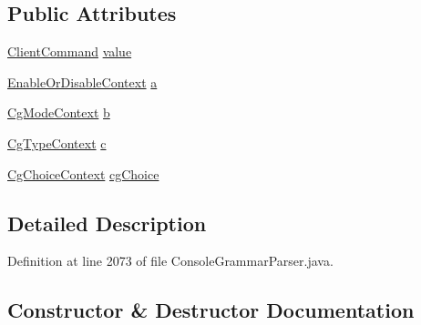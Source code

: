 \subsection*{Public Attributes}
\begin{DoxyCompactItemize}
\item 
\hyperlink{classgov_1_1nasa_1_1jpf_1_1inspector_1_1client_1_1_client_command}{Client\+Command} \hyperlink{classgov_1_1nasa_1_1jpf_1_1inspector_1_1client_1_1parser_1_1_console_grammar_parser_1_1_cmd_choice_generators_context_a014d7742f82aa480136081f8bbd0e389}{value}
\item 
\hyperlink{classgov_1_1nasa_1_1jpf_1_1inspector_1_1client_1_1parser_1_1_console_grammar_parser_1_1_enable_or_disable_context}{Enable\+Or\+Disable\+Context} \hyperlink{classgov_1_1nasa_1_1jpf_1_1inspector_1_1client_1_1parser_1_1_console_grammar_parser_1_1_cmd_choice_generators_context_a9200bbbd967ddd27d65c91ed74a236aa}{a}
\item 
\hyperlink{classgov_1_1nasa_1_1jpf_1_1inspector_1_1client_1_1parser_1_1_console_grammar_parser_1_1_cg_mode_context}{Cg\+Mode\+Context} \hyperlink{classgov_1_1nasa_1_1jpf_1_1inspector_1_1client_1_1parser_1_1_console_grammar_parser_1_1_cmd_choice_generators_context_aeab2b7b67ee700c7a202cdd3e381b382}{b}
\item 
\hyperlink{classgov_1_1nasa_1_1jpf_1_1inspector_1_1client_1_1parser_1_1_console_grammar_parser_1_1_cg_type_context}{Cg\+Type\+Context} \hyperlink{classgov_1_1nasa_1_1jpf_1_1inspector_1_1client_1_1parser_1_1_console_grammar_parser_1_1_cmd_choice_generators_context_a5e71d56306b980decd5eb0430415eeda}{c}
\item 
\hyperlink{classgov_1_1nasa_1_1jpf_1_1inspector_1_1client_1_1parser_1_1_console_grammar_parser_1_1_cg_choice_context}{Cg\+Choice\+Context} \hyperlink{classgov_1_1nasa_1_1jpf_1_1inspector_1_1client_1_1parser_1_1_console_grammar_parser_1_1_cmd_choice_generators_context_a3cd60475bb50ab9e9930b58121519142}{cg\+Choice}
\end{DoxyCompactItemize}


\subsection{Detailed Description}


Definition at line 2073 of file Console\+Grammar\+Parser.\+java.



\subsection{Constructor \& Destructor Documentation}
